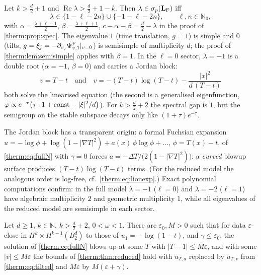 \begin{proposition}\label{therm:prop:specfull}
Let $k>\frac d2+1$ and $\operatorname{Re}\lambda>\frac d2+1-k$.  Then $\lambda\in\sigma_p(\mathbf L_{\rm F})$ iff
\begin{equation}\label{therm:eq:eigsfull}
  \lambda\in\{1-\ell-2n\}\cup\{-1-\ell-2n\},\qquad\ell,n\in\mathbb{N}_0,
\end{equation}
with $\alpha=\frac{\lambda+\ell-1}2$, $\beta=\frac{\lambda+\ell+1}2$, $c-\alpha-\beta=\frac d2-\lambda$ in the proof of
\cref{therm:prop:spec}.  The eigenvalue $1$ (time translation, $g=1$) is simple and
$0$ (tilts, $g=\xi_j=-\partial_{v_j}\Psi^{\rm F}_{v,1}|_{v=0}$) is semisimple of multiplicity $d$; the
proof of \cref{therm:lem:semisimple} applies with $\beta=1$.  In the $\ell=0$
sector, $\lambda=-1$ is a double root ($\alpha=-1$, $\beta=0$) and carries a Jordan block:
\begin{equation}\label{therm:eq:jordan}
  v=T-t \quad\text{and}\quad v=-(T-t)\log(T-t)-\frac{|x|^2}{d\,(T-t)}
\end{equation}
both solve the linearised equation (the second is a generalised eigenfunction,
$\varphi\propto e^{-\tau}\bigl(\tau\cdot1+{\rm const}-|\xi|^2/d\bigr)$).  For $k>\frac d2+2$ the spectral gap is
$1$, but the semigroup on the stable subspace decays only like $(1+\tau)e^{-\tau}$.
\end{proposition}
The Jordan block has a transparent origin: a formal Fuchsian expansion
$u=-\log\phi+\log(1-|\nabla T|^2)+a(x)\,\phi\log\phi+\dots$, $\phi=T(x)-t$, of
\cref{therm:eq:fullN} with $\gamma=0$ forces
$a=-\Delta T/\bigl(2(1-|\nabla T|^2)\bigr)$: a \emph{curved} blowup surface produces
$(T-t)\log(T-t)$ terms.  (For the reduced model the analogous order is
log-free, cf.\ \cref{therm:eq:liouexp}.)  Exact polynomial computations confirm:
in the full model $\lambda=-1$ ($\ell=0$) and $\lambda=-2$ ($\ell=1$) have algebraic
multiplicity $2$ and geometric multiplicity $1$, while all eigenvalues of the
reduced model are semisimple in each sector.

\begin{theorem}\label{therm:thm:full}
Let $d\ge1$, $k\in\mathbb{N}$, $k>\frac d2+2$, $0<\omega<1$.  There are $\varepsilon_0,M>0$ such that
for data $\varepsilon$-close in $H^k\times H^{k-1}(B^d_2)$ to those of $u_1=-\log(1-t)$, and
$\gamma\le\varepsilon_0$, the solution of \cref{therm:eq:fullN} blows up at some $T$ with
$|T-1|\le M\varepsilon$, and with some $|v|\le M\varepsilon$ the bounds of
\cref{therm:thm:reduced} hold with $u_{T,a}$ replaced by $u_{T,v}$ from
\cref{therm:eq:tilted} and $M\varepsilon$ by $M(\varepsilon+\gamma)$.
\end{theorem}

